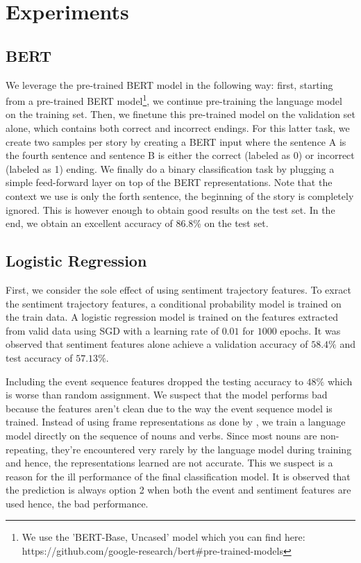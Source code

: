 \documentclass{article}
\begin{document}
\section{Experiments}

\subsection{BERT}

We leverage the pre-trained BERT model in the following way: first, starting from a pre-trained BERT model\footnote{We use the 'BERT-Base, Uncased' model which you can find here: https://github.com/google-research/bert\#pre-trained-models}, we continue pre-training the language model on the training set.
Then, we finetune this pre-trained model on the validation set alone, which contains both correct and incorrect endings. For this latter task, we create two samples per story by creating a BERT input where the sentence A is the fourth sentence and sentence B is either the correct (labeled as 0) or incorrect (labeled as 1) ending. 
We finally do a binary classification task by plugging a simple feed-forward layer on top of the BERT representations.
Note that the context we use is only the forth sentence, the beginning of the story is completely ignored. This is however enough to obtain good results on the test set. In the end, we obtain an excellent accuracy of 86.8\% on the test set.

\subsection{Logistic Regression}

First, we consider the sole effect of using sentiment trajectory features. To exract the sentiment trajectory  features, a conditional probability model is trained on the train data. A logistic regression model is trained on the features extracted from valid data using SGD with a learning rate of $0.01$ for $1000$ epochs. It was observed that sentiment features alone achieve a validation accuracy of $58.4\%$ and test accuracy of $57.13\%$.

Including the event sequence features dropped the testing accuracy to $48\%$ which is worse than random assignment. We suspect that the model performs bad because the features aren't clean due to the way the event sequence model is trained. Instead of using frame representations as done by \cite{hcm}, we train a language model directly on the sequence of nouns and verbs. Since most nouns are non-repeating, they're encountered very rarely by the language model during training and hence, the representations learned are not accurate. This we suspect is a reason for the ill performance of the final classification model. It is observed that the prediction is always option 2 when both the event and sentiment features are used hence, the bad performance.
\end{document}
